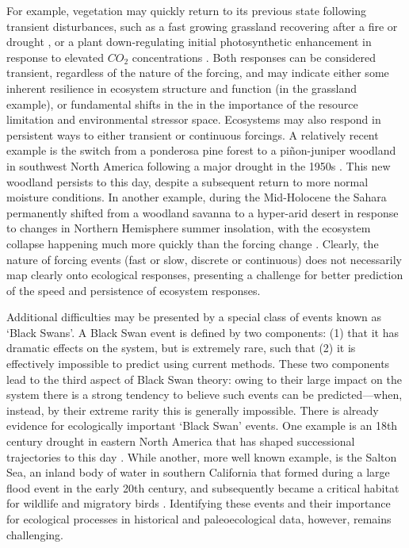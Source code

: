 \documentclass[11pt,a4paper,oneside]{article}
\begin{document}
For example, vegetation may quickly return to its previous state following transient disturbances, such as a fast growing grassland recovering after a fire or drought \citep[e.g.,][]{Weaver1936,albertson1944}, or a plant down-regulating initial photosynthetic enhancement in response to elevated $CO_{2}$ concentrations \citep{eatonrye2012}. Both responses can be considered transient, regardless of the nature of the forcing, and may indicate either some inherent resilience in ecosystem structure and function (in the grassland example), or fundamental shifts in the in the importance of the resource limitation and environmental stressor space. Ecosystems may also respond in persistent ways to either transient or continuous forcings. A relatively recent example is the switch from a ponderosa pine forest to a pi\~non-juniper woodland in southwest North America following a major drought in the 1950s \citep{Allen1998}. This new woodland persists to this day, despite a subsequent return to more normal moisture conditions. In another example, during the Mid-Holocene the Sahara permanently shifted from a woodland savanna to a hyper-arid desert in response to changes in Northern Hemisphere summer insolation, with the ecosystem collapse happening much more quickly than the forcing change \citep{Foley2003}. Clearly, the nature of forcing events (fast or slow, discrete or continuous) does not necessarily map clearly onto ecological responses, presenting a challenge for better prediction of the speed and persistence of ecosystem responses.

Additional difficulties may be presented by a special class of events known as `Black Swans'. A Black Swan event is defined by two components: (1) that it has dramatic effects on the system, but is extremely rare, such that (2) it is effectively impossible to predict using current methods. These two components lead to the third aspect of Black Swan theory: owing to their large impact on the system there is a strong tendency to believe such events can be predicted---when, instead, by their extreme rarity this is generally impossible.  There is already evidence for ecologically important `Black Swan' events. One example is an 18th century drought in eastern North America that has shaped successional trajectories to this day \citep{Pederson2014}. While another, more well known example, is the Salton Sea, an inland body of water in southern California that formed during a large flood event in the early 20th century, and subsequently became a critical habitat for wildlife and migratory birds \citep{Cohn2000}. Identifying these events and their importance for ecological processes in historical and paleoecological data, however, remains challenging.\\ 
\end{document}
